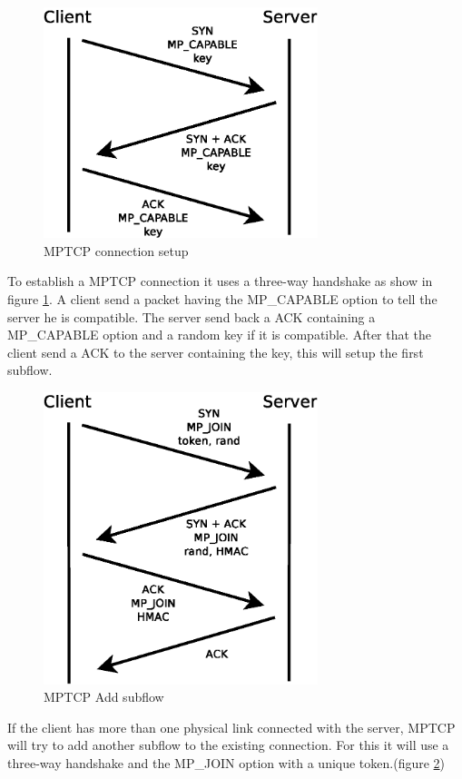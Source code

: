   \begin{figure}[h!]
    \centering
    \includegraphics[width=8cm]{./images/mptcp_connection_setup.eps}
    \caption{MPTCP connection setup}
    \label{mptcp_connection_setup}
  \end{figure}


  To establish a MPTCP connection it uses a three-way handshake as show in figure \ref{mptcp_connection_setup}.
  A client send a packet having the MP\_CAPABLE option to tell the server he is compatible.
  The server send back a ACK containing a MP\_CAPABLE option and a random key if it is compatible.
  After that the client send a ACK to the server containing the key, this will setup the first subflow.

  \begin{figure}[h!]
    \centering
    \includegraphics[width=8cm]{./images/mptcp_mp_join.eps}
    \caption{MPTCP Add subflow}
    \label{mptcp_mp_join}
  \end{figure}

  If the client has more than one physical link connected with the server, MPTCP will try to add another subflow to the existing connection.
  For this it will use a three-way handshake and the MP\_JOIN option with a unique token.(figure \ref{mptcp_mp_join})

